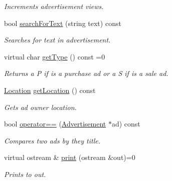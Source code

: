 \begin{DoxyCompactItemize}
\begin{DoxyCompactList}\small\item\em Increments advertisement views. \end{DoxyCompactList}\item 
bool \hyperlink{class_advertisement_a883fc4cf6525ed95001f5c21c8a4d2ff}{search\+For\+Text} (string text) const 
\begin{DoxyCompactList}\small\item\em Searches for text in advertisement. \end{DoxyCompactList}\item 
virtual char \hyperlink{class_advertisement_acb3174a830215ed6dfd922002f2c8924}{get\+Type} () const  =0
\begin{DoxyCompactList}\small\item\em Returns a P if is a purchase ad or a S if is a sale ad. \end{DoxyCompactList}\item 
\hyperlink{class_location}{Location} \hyperlink{class_advertisement_a353ac42132683f145b64cf00cd9bdf40}{get\+Location} () const 
\begin{DoxyCompactList}\small\item\em Gets ad owner location. \end{DoxyCompactList}\item 
bool \hyperlink{class_advertisement_a72e7b7fe8f2d1070fa2682d268e39567}{operator==} (\hyperlink{class_advertisement}{Advertisement} $\ast$ad) const 
\begin{DoxyCompactList}\small\item\em Compares two ads by they title. \end{DoxyCompactList}\item 
virtual ostream \& \hyperlink{class_advertisement_adb38cc00b914dd7a0509829c220eb2bc}{print} (ostream \&out)=0
\begin{DoxyCompactList}\small\item\em Prints to out. \end{DoxyCompactList}\end{DoxyCompactItemize}
